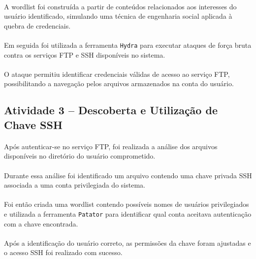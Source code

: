 \paragraph{}
A wordlist foi construída a partir de conteúdos relacionados aos interesses do
usuário identificado, simulando uma técnica de engenharia social aplicada à
quebra de credenciais.

\paragraph{}
Em seguida foi utilizada a ferramenta \texttt{Hydra} para executar ataques de
força bruta contra os serviços FTP e SSH disponíveis no sistema.

\paragraph{}
O ataque permitiu identificar credenciais válidas de acesso ao serviço FTP,
possibilitando a navegação pelos arquivos armazenados na conta do usuário.

\subsection{Atividade 3 -- Descoberta e Utilização de Chave SSH}

\paragraph{}
Após autenticar-se no serviço FTP, foi realizada a análise dos arquivos
disponíveis no diretório do usuário comprometido.

\paragraph{}
Durante essa análise foi identificado um arquivo contendo uma chave privada SSH
associada a uma conta privilegiada do sistema.

\paragraph{}
Foi então criada uma wordlist contendo possíveis nomes de usuários
privilegiados e utilizada a ferramenta \texttt{Patator} para identificar qual
conta aceitava autenticação com a chave encontrada.

\paragraph{}
Após a identificação do usuário correto, as permissões da chave foram ajustadas
e o acesso SSH foi realizado com sucesso.

